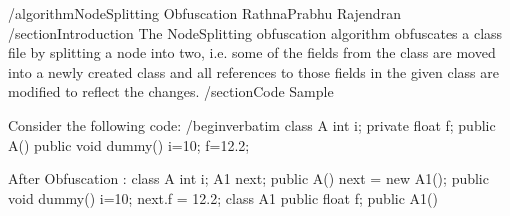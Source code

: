 /algorithm{NodeSplitting Obfuscation}%
	{RathnaPrabhu Rajendran}
/section{Introduction}
The NodeSplitting obfuscation algorithm obfuscates a class file 
by splitting a node into two, i.e. some of the fields from the class are moved
into a newly created class and all references to those fields in the given class are modified to reflect the changes.
/section{Code Sample}

Consider the following code:
/begin{verbatim}
class A {
	int i;
	private float f;
	public A(){ }
	public void dummy() {
		i=10;
		f=12.2;
	}
}

After Obfuscation :
class A {
	int i;
	A1 next;
	public A() {
		next = new A1();
	}
	public void dummy() {
		i=10;
		next.f = 12.2;
	}
}
class A1 {
	public float f;
	public A1() { }
}
